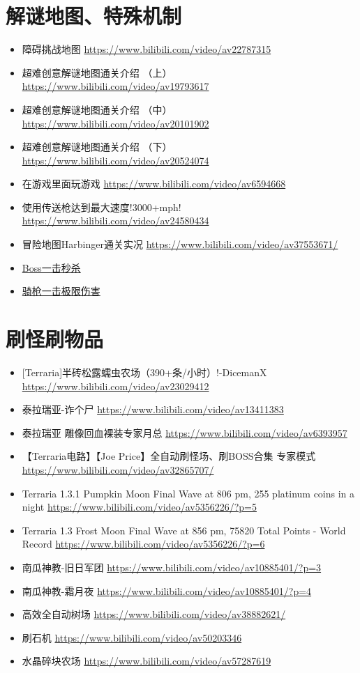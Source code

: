 \section{解谜地图、特殊机制}
\begin{itemize}
\item 障碍挑战地图 \url{https://www.bilibili.com/video/av22787315}
\item 超难创意解谜地图通关介绍 （上） \url{https://www.bilibili.com/video/av19793617}
\item 超难创意解谜地图通关介绍 （中） \url{https://www.bilibili.com/video/av20101902}
\item 超难创意解谜地图通关介绍 （下） \url{https://www.bilibili.com/video/av20524074}
\item 在游戏里面玩游戏 \url{https://www.bilibili.com/video/av6594668}
\item 使用传送枪达到最大速度!3000+mph! \url{https://www.bilibili.com/video/av24580434}
\item 冒险地图Harbinger通关实况 \url{https://www.bilibili.com/video/av37553671/}
\item \href{https://www.bilibili.com/video/av20725652}{Boss一击秒杀}
\item \href{https://www.bilibili.com/video/BV1Df4y1s75E}{骑枪一击极限伤害}
\end{itemize}

\section{刷怪刷物品}
\begin{itemize}
\item {[}Terraria]半砖松露蠕虫农场（390+条/小时）!-DicemanX \url{https://www.bilibili.com/video/av23029412}
\item 泰拉瑞亚-诈个尸 \url{https://www.bilibili.com/video/av13411383}
\item 泰拉瑞亚 雕像回血裸装专家月总 \url{https://www.bilibili.com/video/av6393957}
\item 【Terraria电路】【Joe Price】全自动刷怪场、刷BOSS合集 专家模式 \url{https://www.bilibili.com/video/av32865707/}
\item Terraria 1.3.1 Pumpkin Moon Final Wave at 806 pm, 255 platinum coins in a night \url{https://www.bilibili.com/video/av5356226/?p=5}
\item Terraria 1.3 Frost Moon Final Wave at 856 pm, 75820 Total Points - World Record \url{https://www.bilibili.com/video/av5356226/?p=6}

\item 南瓜神教-旧日军团 \url{https://www.bilibili.com/video/av10885401/?p=3}
\item 南瓜神教-霜月夜 \url{https://www.bilibili.com/video/av10885401/?p=4}
\item 高效全自动树场 \url{https://www.bilibili.com/video/av38882621/}
\item 刷石机 \url{https://www.bilibili.com/video/av50203346}
\item 水晶碎块农场 \url{https://www.bilibili.com/video/av57287619}
\end{itemize}

